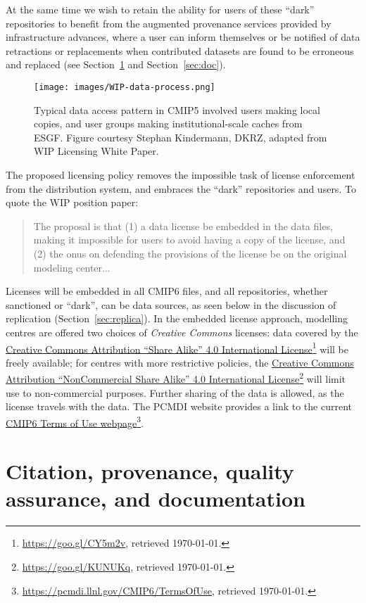 \documentclass[gmd,manuscript]{copernicus}
\newcommand{\urlref}[2] {\href{#1}{#2}\footnote{\url{#1}, retrieved \today.}}
\begin{document}
At the same time we wish to retain the ability for users of these ``dark''
repositories to benefit from the augmented provenance services provided by
infrastructure advances, where a user can inform themselves or be notified
of data retractions or replacements when contributed datasets are found to be
erroneous and replaced (see Section~\ref{sec:cite} and Section~\ref{sec:doc}).

\begin{figure*}
  \begin{center}
    \texttt{[image: images/WIP-data-process.png]}
  \end{center}
  \caption{Typical data access pattern in CMIP5 involved users making
    local copies, and user groups making institutional-scale caches
    from ESGF. Figure courtesy Stephan Kindermann, DKRZ, adapted from
    WIP Licensing White Paper.}
  \label{fig:dark}
\end{figure*}

The proposed licensing policy removes the impossible
task of license enforcement from the distribution system, and embraces
the ``dark'' repositories and users. To quote the WIP position paper:

\begin{quote}
  The proposal is that (1) a data license be embedded in the data
  files, making it impossible for users to avoid having a copy of the
  license, and (2) the onus on defending the provisions of the license
  be on the original modeling center...
\end{quote}

Licenses will be embedded in all CMIP6 files, and all repositories, whether
sanctioned or ``dark'', can be data sources, as seen below in the
discussion of replication (Section~\ref{sec:replica}).
In the embedded license approach, modelling centres are offered two
choices of \emph{Creative Commons} licenses: data covered by the
\urlref{https://goo.gl/CY5m2v}{Creative Commons Attribution ``Share
  Alike'' 4.0 International License} will be freely available; for
centres with more restrictive policies, the
\urlref{https://goo.gl/KUNUKq}{Creative Commons Attribution
  ``NonCommercial Share Alike'' 4.0 International License} will limit use 
to non-commercial purposes. Further sharing of the data
is allowed, as the license travels with the data. The PCMDI website
provides a link to the current
\urlref{https://pcmdi.llnl.gov/CMIP6/TermsOfUse}{CMIP6 Terms of Use
  webpage}.

\section{Citation, provenance, quality assurance, and documentation}
\label{sec:cite}
\end{document}
